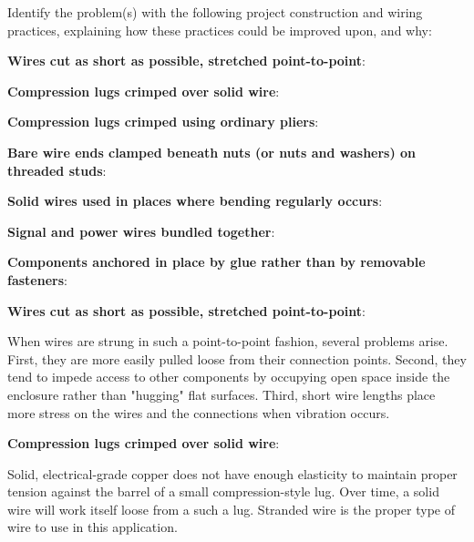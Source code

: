 

Identify the problem(s) with the following project construction and wiring practices, explaining how these practices could be improved upon, and why:

\vskip 10pt

\noindent
{\bf Wires cut as short as possible, stretched point-to-point}:

\vskip 30pt

\noindent
{\bf Compression lugs crimped over solid wire}:

\vskip 30pt

\noindent
{\bf Compression lugs crimped using ordinary pliers}:

\vskip 30pt

\noindent
{\bf Bare wire ends clamped beneath nuts (or nuts and washers) on threaded studs}:

\vskip 30pt

\noindent
{\bf Solid wires used in places where bending regularly occurs}:

\vskip 30pt

\noindent
{\bf Signal and power wires bundled together}:

\vskip 30pt

\noindent
{\bf Components anchored in place by glue rather than by removable fasteners}:

\vskip 30pt







\noindent
{\bf Wires cut as short as possible, stretched point-to-point}:

When wires are strung in such a point-to-point fashion, several problems arise.  First, they are more easily pulled loose from their connection points.  Second, they tend to impede access to other components by occupying open space inside the enclosure rather than "hugging" flat surfaces.  Third, short wire lengths place more stress on the wires and the connections when vibration occurs.

\vskip 10pt

\noindent
{\bf Compression lugs crimped over solid wire}:

Solid, electrical-grade copper does not have enough elasticity to maintain proper tension against the barrel of a small compression-style lug.  Over time, a solid wire will work itself loose from a such a lug.  Stranded wire is the proper type of wire to use in this application.

